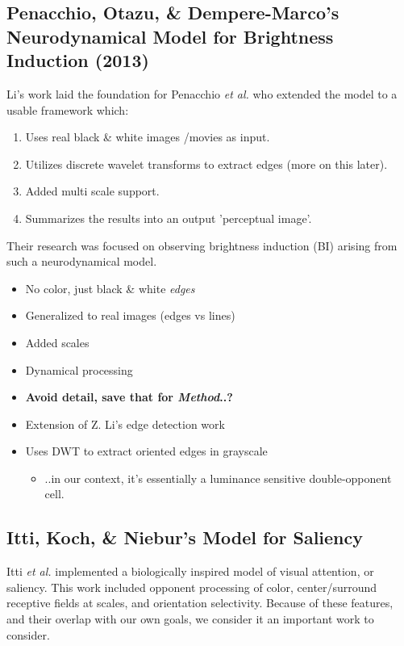 \documentclass[journal,onecolumn]{IEEEtran}
\begin{document}
\subsection*{Penacchio, Otazu, \& Dempere-Marco's Neurodynamical Model for Brightness Induction (2013)}

Li's work laid the foundation for Penacchio \textit{et al.} who extended the model to a usable framework which:
\begin{enumerate}
    \item Uses real black \& white images /movies as input.
    \item Utilizes discrete wavelet transforms to extract edges (more on this later).
    \item Added multi scale support.
    \item Summarizes the results into an output 'perceptual image'.
\end{enumerate}
Their research was focused on observing brightness induction (BI) arising from such a neurodynamical model.
\begin{itemize}
    \item No color, just black \& white \textit{edges}
    \item Generalized to real images (edges vs lines)
    \item Added scales
    \item Dynamical processing
    \item \textbf{Avoid detail, save that for \textit{Method}..?}
    \item Extension of Z. Li's edge detection work
    \item Uses DWT to extract oriented edges in grayscale
    \begin{itemize}
        \item ..in our context, it's essentially a luminance sensitive double-opponent cell.
    \end{itemize}
\end{itemize}

\subsection*{Itti, Koch, \& Niebur's Model for Saliency \cite{itti:1998}}

Itti \textit{et al.} implemented a biologically inspired model of visual attention, or saliency. This work included opponent processing of color, center/surround receptive fields at scales, and orientation selectivity. Because of these features, and their overlap with our own goals, we consider it an important work to consider.
\end{document}
